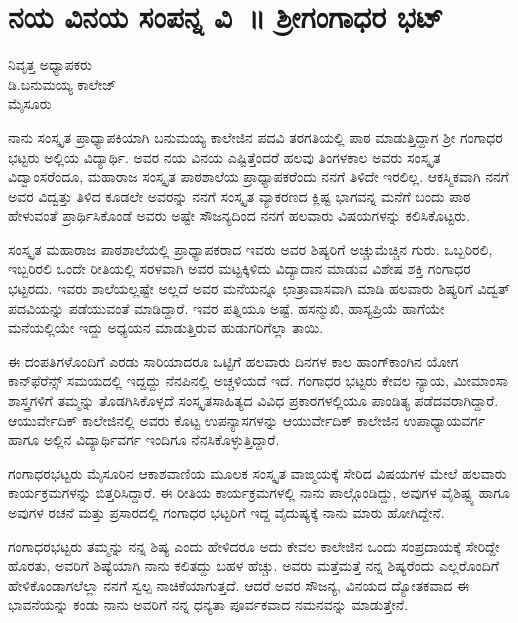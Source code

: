 {\fontsize{14}{16}\selectfont
\chapter{ನಯ ವಿನಯ ಸಂಪನ್ನ ವಿ~॥ ಶ್ರೀಗಂಗಾಧರ ಭಟ್}

\begin{center}
\smallskip

ನಿವೃತ್ತ ಅಧ್ಯಾಪಕರು\\
ಡಿ.ಬನುಮಯ್ಯ ಕಾಲೇಜ್\\
ಮೈಸೂರು
\addrule
\end{center}

ನಾನು ಸಂಸ್ಕೃತ ಪ್ರಾಧ್ಯಾಪಕಿಯಾಗಿ ಬನುಮಯ್ಯ ಕಾಲೇಜಿನ ಪದವಿ ತರಗತಿಯಲ್ಲಿ ಪಾಠ ಮಾಡುತ್ತಿದ್ದಾಗ ಶ್ರೀ ಗಂಗಾಧರ ಭಟ್ಟರು ಅಲ್ಲಿಯ ವಿದ್ಯಾರ್ಥಿ. ಅವರ ನಯ ವಿನಯ ಎಷ್ಟಿತ್ತೆಂದರೆ ಹಲವು ತಿಂಗಳಕಾಲ ಅವರು ಸಂಸ್ಕೃತ ವಿದ್ವಾಂಸರೆಂದೂ, ಮಹಾರಾಜ ಸಂಸ್ಕೃತ ಪಾಠಶಾಲೆಯ ಪ್ರಾಧ್ಯಾಪಕರೆಂದು ನನಗೆ ತಿಳಿದೇ ಇರಲಿಲ್ಲ. ಆಕಸ್ಮಿಕವಾಗಿ ನನಗೆ ಅವರ ವಿದ್ವತ್ತು ತಿಳಿದ ಕೂಡಲೇ ಅವರನ್ನು ನನಗೆ ಸಂಸ್ಕೃತ ವ್ಯಾಕರಣದ ಕ್ಲಿಷ್ಟ ಭಾಗವನ್ನ ಮನೆಗೆ ಬಂದು ಪಾಠ ಹೇಳುವಂತೆ ಪ್ರಾರ್ಥಿಸಿಕೊಂಡೆ ಅವರು ಅಷ್ಟೇ ಸೌಜನ್ಯದಿಂದ ನನಗೆ ಹಲವಾರು ವಿಷಯಗಳನ್ನು ಕಲಿಸಿಕೊಟ್ಟರು.

ಸಂಸ್ಕೃತ ಮಹಾರಾಜ ಪಾಠಶಾಲೆಯಲ್ಲಿ ಪ್ರಾಧ್ಯಾಪಕರಾದ ಇವರು ಅವರ ಶಿಷ್ಯರಿಗೆ ಅಚ್ಚುಮೆಚ್ಚಿನ ಗುರು. ಒಬ್ಬರಿರಲಿ, ಇಬ್ಬರಿರಲಿ ಒಂದೇ ರೀತಿಯಲ್ಲಿ ಸರಳವಾಗಿ ಅವರ ಮಟ್ಟಕ್ಕಿಳಿದು ವಿದ್ಯಾದಾನ ಮಾಡುವ ವಿಶೇಷ ಶಕ್ತಿ ಗಂಗಾಧರ ಭಟ್ಟರದು. ಇವರು ಶಾಲೆಯಲ್ಲಷ್ಟೇ ಅಲ್ಲದೆ ಅವರ ಮನೆಯನ್ನೂ ಛಾತ್ರಾವಾಸವಾಗಿ ಮಾಡಿ ಹಲವಾರು ಶಿಷ್ಯರಿಗೆ ವಿದ್ವತ್ ಪದವಿಯನ್ನು ಪಡೆಯುವಂತೆ ಮಾಡಿದ್ದಾರೆ. ಇವರ ಪತ್ನಿಯೂ ಅಷ್ಟೆ. ಹಸನ್ಮುಖಿ, ಹಾಸ್ಯಪ್ರಿಯೆ ಹಾಗೆಯೇ ಮನೆಯಲ್ಲಿಯೇ ಇದ್ದು ಅಧ್ಯಯನ ಮಾಡುತ್ತಿರುವ ಹುಡುಗರಿಗೆಲ್ಲಾ ತಾಯಿ.

ಈ ದಂಪತಿಗಳೊಂದಿಗೆ ಎರಡು ಸಾರಿಯಾದರೂ ಒಟ್ಟಿಗೆ ಹಲವಾರು ದಿನಗಳ ಕಾಲ ಹಾಂಗ್‍ಕಾಂಗಿನ ಯೋಗ ಕಾನ್‍ಫೆರೆನ್ಸ್ ಸಮಯದಲ್ಲಿ ಇದ್ದದ್ದು ನೆನಪಿನಲ್ಲಿ ಅಚ್ಚಳಿಯದೆ ಇದೆ. ಗಂಗಾಧರ ಭಟ್ಟರು ಕೇವಲ ನ್ಯಾಯ, ಮೀಮಾಂಸಾ ಶಾಸ್ತ್ರಗಳಿಗೆ ತಮ್ಮನ್ನು ತೊಡಗಿಸಿಕೊಳ್ಳದೆ ಸಂಸ್ಕೃತಸಾಹಿತ್ಯದ ವಿವಿಧ ಪ್ರಕಾರಗಳಲ್ಲಿಯೂ ಪಾಂಡಿತ್ಯ ಪಡೆದವರಾಗಿದ್ದಾರೆ. ಆಯುರ್ವೇದಿಕ್ ಕಾಲೇಜಿನಲ್ಲಿ ಅವರು ಕೊಟ್ಟ ಉಪನ್ಯಾಸಗಳನ್ನು ಆಯುರ್ವೇದಿಕ್ ಕಾಲೇಜಿನ ಉಪಾಧ್ಯಾಯವರ್ಗ ಹಾಗೂ ಅಲ್ಲಿನ ವಿದ್ಯಾರ್ಥಿವರ್ಗ ಇಂದಿಗೂ ನೆನಸಿಕೊಳ್ಳುತ್ತಿದ್ದಾರೆ.

ಗಂಗಾಧರಭಟ್ಟರು ಮೈಸೂರಿನ ಆಕಾಶವಾಣಿಯ ಮೂಲಕ ಸಂಸ್ಕೃತ ವಾಙ್ಮಯಕ್ಕೆ ಸೇರಿದ ವಿಷಯಗಳ ಮೇಲೆ ಹಲವಾರು ಕಾರ್ಯಕ್ರಮಗಳನ್ನು ಬಿತ್ತರಿಸಿದ್ದಾರೆ. ಈ ರೀತಿಯ ಕಾರ್ಯಕ್ರಮಗಳಲ್ಲಿ ನಾನು ಪಾಲ್ಗೊಂಡಿದ್ದು, ಅವುಗಳ ವೈಶಿಷ್ಟ್ಯ ಹಾಗೂ ಅವುಗಳ ರಚನೆ ಮತ್ತು ಪ್ರಸಾರದಲ್ಲಿ ಗಂಗಾಧರ ಭಟ್ಟರಿಗೆ ಇದ್ದ ವೈದುಷ್ಯಕ್ಕೆ ನಾನು ಮಾರು ಹೋಗಿದ್ದೇನೆ.

ಗಂಗಾಧರಭಟ್ಟರು ತಮ್ಮನ್ನು ನನ್ನ ಶಿಷ್ಯ ಎಂದು ಹೇಳಿದರೂ ಅದು ಕೇವಲ ಕಾಲೇಜಿನ ಒಂದು ಸಂಪ್ರದಾಯಕ್ಕೆ ಸೇರಿದ್ದೇ ಹೊರತು, ಅವರಿಗೆ ಶಿಷ್ಯೆಯಾಗಿ ನಾನು ಕಲಿತದ್ದು ಬಹಳ ಹೆಚ್ಚು. ಅವರು ಮತ್ತೆಮತ್ತೆ ನನ್ನ ಶಿಷ್ಯರೆಂದು ಎಲ್ಲರೊಂದಿಗೆ ಹೇಳಿಕೊಂಡಾಗಲೆಲ್ಲಾ ನನಗೆ ಸ್ವಲ್ಪ ನಾಚಿಕೆಯಾಗುತ್ತದೆ. ಆದರೆ ಅವರ ಸೌಜನ್ಯ, ವಿನಯದ ದ್ಯೋತಕವಾದ ಈ ಭಾವನೆಯನ್ನು ಕಂಡು ನಾನು ಅವರಿಗೆ ನನ್ನ ಧನ್ಯತಾ ಪೂರ್ವಕವಾದ ನಮನವನ್ನು ಮಾಡುತ್ತೇನೆ.

}
